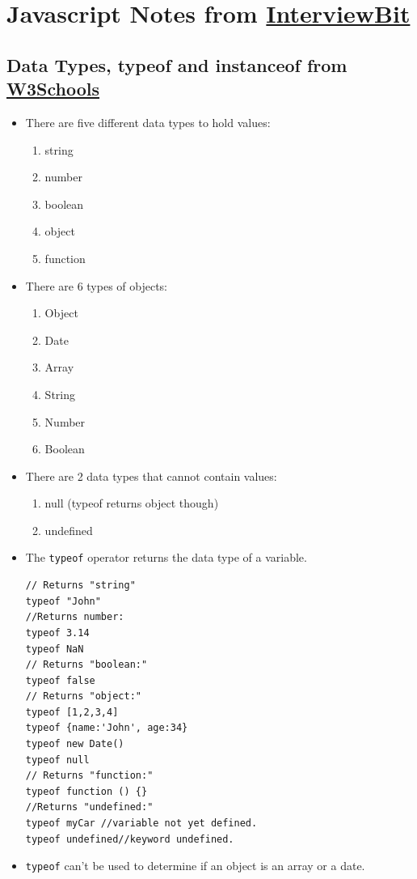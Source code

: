 \documentclass{report}
\begin{document}
\chapter{Javascript Notes from \href{https://www.interviewbit.com/javascript-interview-questions/}{InterviewBit}}
\section{Data Types, typeof and instanceof from \href{https://www.w3schools.com/js/js_typeof.asp}{W3Schools}}
\begin{itemize}
\item There are five different data types to hold values:
\begin{enumerate}
    \item string
    \item number
    \item boolean
    \item object
    \item function
\end{enumerate}
\item There are 6 types of objects:
\begin{enumerate}
\item Object
\item Date
\item Array
\item String
\item Number
\item Boolean
\end{enumerate}
\item There are 2 data types that cannot contain values:
\begin{enumerate}
\item null (typeof returns object though)
\item undefined
\end{enumerate}
\item The \texttt{typeof} operator returns the data type of a variable.
\begin{lstlisting}
// Returns "string"
typeof "John"
//Returns number:
typeof 3.14
typeof NaN
// Returns "boolean:"
typeof false
// Returns "object:"
typeof [1,2,3,4]              
typeof {name:'John', age:34}  
typeof new Date()
typeof null
// Returns "function:"
typeof function () {}         
//Returns "undefined:"
typeof myCar //variable not yet defined.
typeof undefined//keyword undefined.
\end{lstlisting}
\item \texttt{typeof} can't be used to determine if an object is an array or a date.

\end{itemize}
\end{document}
